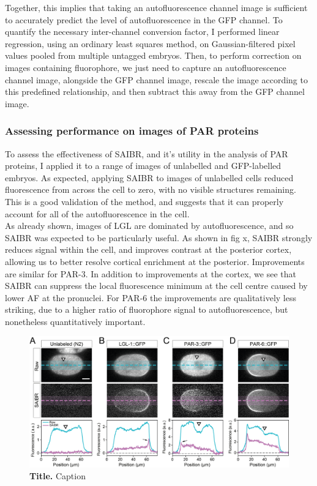 \documentclass[12pt]{"article"}
\newcommand{\mycaption}[2]{\caption[#1]{\textbf{#1.} #2}}
\begin{document}
Together, this implies that taking an autofluorescence channel image is sufficient to accurately predict the level of autofluorescence in the GFP channel. To quantify the necessary inter-channel conversion factor, I performed linear regression, using an ordinary least squares method, on Gaussian-filtered pixel values pooled from multiple untagged embryos. Then, to perform correction on images containing fluorophore, we just need to capture an autofluorescence channel image, alongside the GFP channel image, rescale the image according to this predefined relationship, and then subtract this away from the GFP channel image.\\


\subsubsection{Assessing performance on images of PAR proteins}

To assess the effectiveness of SAIBR, and it’s utility in the analysis of PAR proteins, I applied it to a range of images of unlabelled and GFP-labelled embryos. As expected, applying SAIBR to images of unlabelled cells reduced fluorescence from across the cell to zero, with no visible structures remaining. This is a good validation of the method, and suggests that it can properly account for all of the autofluorescence in the cell. \\

As already shown, images of LGL are dominated by autofluorescence, and so SAIBR was expected to be particularly useful. As shown in fig x, SAIBR strongly reduces signal within the cell, and improves contrast at the posterior cortex, allowing us to better resolve cortical enrichment at the posterior. Improvements are similar for PAR-3. In addition to improvements at the cortex, we see that SAIBR can suppress the local fluorescence minimum at the cell centre caused by lower AF at the pronuclei. For PAR-6 the improvements are qualitatively less striking, due to a higher ratio of fluorophore signal to autofluorescence, but nonetheless quantitatively important.\\

\begin{figure}[!h]
\includegraphics[scale=0.9]{saibr_spatial_correction}
\setlength{\abovecaptionskip}{20pt}
\centering
\mycaption{Title}{Caption}
\label{fig:saibr_spatial_correction}
\end{figure}
\end{document}
